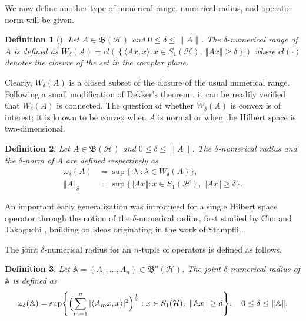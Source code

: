 \documentclass[12pt]{article}
\newtheorem{definition}{Definition}
\begin{document}
We now define another type of numerical range, numerical radius, and operator norm will be given.

\begin{definition}[\!\!\cite{Stampfli1970}]
\label{def2}
Let $A \in \mathfrak{B}(\mathcal{H})$ and $0 \leq \delta \leq \|A\|$.
The $\delta$-numerical range of $A$ is defined as
\(
    W_{\delta}(A)=cl\left( \left\lbrace  \langle Ax,x\rangle: x\in S_{1}(\mathcal{H}), \ \Vert Ax \Vert\geq \delta \right\rbrace \right)
\)
where $cl(\cdot)$ denotes the closure of the set in the complex plane.
\end{definition}

Clearly, $W_{\delta}(A)$ is a closed subset of the closure of the usual numerical
range. Following a small modification of Dekker’s theorem \cite{Dekker1969}, it can be readily verified that  $ W_{\delta}(A) $ is connected. The question of whether $ W_{\delta}(A) $ is convex is of interest; it is known to be convex when $ A $ is normal or when the Hilbert space is two-dimensional.

\begin{definition}
\label{def3}
Let $A \in \mathfrak{B}(\mathcal{H})$ and $0 \leq \delta \leq \|A\|$. The
$\delta$-numerical radius and the $ \delta$-norm of $ A $ are defined respectively as
\begin{align*}
\omega_{\delta}(A)  &= \sup\{|\lambda| : \lambda \in W_{\delta}(A)\},
\\
\Vert A \Vert_{\delta} &=\sup\lbrace \Vert A x \Vert:x\in S_{1}(\mathcal{H}), \ \Vert A x \Vert \geq \delta \rbrace .
\end{align*}
\end{definition}

An important early generalization was introduced for a single Hilbert space operator through the notion of the $\delta$-numerical radius, first studied by Cho and Takaguchi \cite{Takaguchi1981}, building on ideas originating in the work of Stampfli \cite{Stampfli1970}.

The joint $\delta$-numerical radius for an $n$-tuple of operators is defined as follows.
\begin{definition}
\label{def4}
Let $\mathbb{A} = (A_{1}, \ldots, A_{n}) \in \mathfrak{B}^{n}(\mathcal{H})$. The joint
$\delta$-numerical radius of $\mathbb{A}$ is defined as
\[
    \omega_{\delta}(\mathbb{A})
    = \sup \Biggl\{
        \Bigl( \sum\limits_{m=1}^{n} |\langle A_{m}x, x\rangle|^{2} \Bigr)^{\frac{1}{2}} :
        x \in S_{1}(\mathcal{H}),\ \|\mathbb{A} x\| \ge \delta
    \Biggr\},
    \quad 0 \le \delta \le \|\mathbb{A}\|.
\]
\end{definition}
\end{document}
